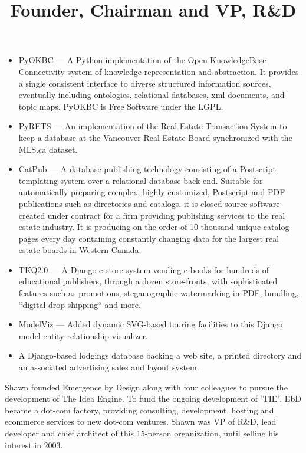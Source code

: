 \begin{resume}
\begin{position}
\begin{itemize}
  \item PyOKBC --- A Python implementation of the Open KnowledgeBase
  Connectivity system of knowledge representation and abstraction.  It
  provides a single consistent interface to diverse structured
  information sources, eventually including ontologies, relational databases,
  xml documents, and topic maps.  PyOKBC is Free Software under the LGPL.

  \item PyRETS --- An implementation of the {Real Estate Transaction System}
  to keep a database at the Vancouver Real Estate Board synchronized with 
  the MLS.ca dataset.

  \item CatPub --- A database publishing technology consisting of a
  Postscript templating system over a relational database back-end.
  Suitable for automatically preparing complex, highly customized,
  Postscript and PDF publications such as directories and catalogs,
  it is closed source software created under contract for a firm
  providing publishing services to the real estate industry.  
  It is producing on the order of 10 thousand unique catalog pages 
  every day containing constantly changing data for the largest 
  real estate boards in Western Canada.

  \item TKQ2.0 --- A Django e-store system vending e-books for hundreds
  of educational publishers, through a dozen store-fronts, with sophisticated 
  features such as promotions, steganographic watermarking in PDF, bundling,
  ``digital drop shipping`` and more.

  \item ModelViz --- Added dynamic SVG-based touring facilities to this Django
  model entity-relationship visualizer.

  \item A Django-based lodgings database backing a web site, a printed 
  directory and an associated advertising sales and layout system.

\end{itemize}

\end{position}




\title{ Founder, Chairman and VP, R\&D }

\begin{position}
  Shawn founded Emergence by Design along with four colleagues to pursue
  the development of The Idea Engine.  To fund the ongoing development of
  'TIE', EbD became a dot-com factory, providing consulting,
  development, hosting and ecommerce services to new dot-com ventures.
  Shawn was VP of R\&D, lead developer and chief architect of this 15-person
  organization, until selling his interest in 2003.


\end{position}
\end{resume}
